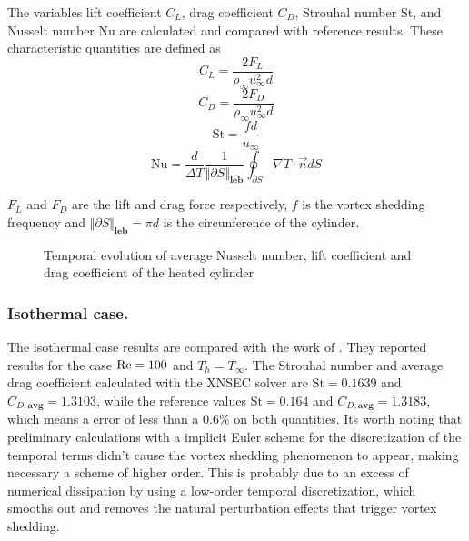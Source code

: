 The variables lift coefficient $C_L$, drag coefficient $C_D$, Strouhal number St, and Nusselt number Nu are calculated and compared with reference results. These characteristic quantities are defined as
\begin{equation} 
	C_L = \frac{2F_L}{\rho_\infty u^2_\infty d}
\end{equation}
\begin{equation}
	C_D = \frac{2F_D}{\rho_\infty u^2_\infty d}
\end{equation}
\begin{equation}
	\text{St} = \frac{fd}{u_\infty}
\end{equation}
\begin{equation}
	\text{Nu} = \frac{d}{\Delta T}\frac{1}{\Vert \partial S\Vert_{\textbf{leb}}}\oint_{\partial S} \nabla T \cdot \vec{n} dS
\end{equation}

$F_L$ and $F_D$ are the lift and drag force respectively, $f$ is the vortex shedding frequency and ${\Vert \partial S\Vert_{\textbf{leb}}}= \pi d$ is the circunference of the cylinder.
\begin{figure}[t]
	\centering	
	\caption{Temporal evolution of average Nusselt number, lift coefficient and drag coefficient of the heated cylinder}	\label{fig:HeatedCylinderResults}
\end{figure}
\subsubsection{Isothermal case.}
The isothermal case results are compared with the work of \textcite{sharmaHEATFLUIDFLOW2004}. They reported results for the case $\text{Re} = 100$ and $T_h = T_\infty$. The Strouhal number and average drag coefficient calculated with the XNSEC solver are $\text{St} = 0.1639$ and $C_{D,\textbf{avg}} = 1.3103$, while the reference values $\text{St} = 0.164$ and $C_{D,\textbf{avg}} = 1.3183$, which means a error of less than a 0.6\% on both quantities. Its worth noting that preliminary calculations with a implicit Euler scheme for the discretization of the temporal terms didn't cause the vortex shedding phenomenon to appear, making necessary a scheme of higher order. This is probably due to an excess of numerical dissipation by using a low-order temporal discretization, which smooths out and removes the natural perturbation effects that trigger vortex shedding.
